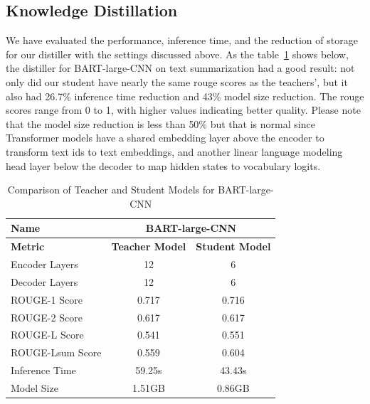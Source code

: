\documentclass{article}
\begin{document}
    \subsection{Knowledge Distillation}
    \hspace*{1em} We have evaluated the performance, inference time, and the reduction of storage for our distiller with the settings discussed above. As the table~\ref{tab:BART_comparison} shows below, the distiller for BART-large-CNN on text summarization had a good result: not only did our student have nearly the same rouge scores as the teachers', but it also had 26.7\% inference time reduction and 43\% model size reduction. The rouge scores range from 0 to 1, with higher values indicating better quality. Please note that the model size reduction is less than 50\% but that is normal since Transformer models have a shared embedding layer above the encoder to transform text ids to text embeddings,  %
    and another linear language modeling head layer below the decoder to map hidden states to vocabulary logits. %

    \begin{table}[h!]
        \centering
        \begin{tabular}{lcc}
            \toprule
            \textbf{Name}         & \multicolumn{2}{c}{\textbf{BART-large-CNN}} \\ \midrule
            \textbf{Metric}       & \textbf{Teacher Model} & \textbf{Student Model} \\ \midrule
            Encoder Layers        & 12                     & 6                     \\
            Decoder Layers        & 12                     & 6                     \\
            ROUGE-1 Score         & 0.717                  & 0.716                  \\
            ROUGE-2 Score         & 0.617                  & 0.617                  \\
            ROUGE-L Score         & 0.541                  & 0.551                  \\
            ROUGE-Lsum Score      & 0.559                  & 0.604                  \\
            Inference Time        & 59.25s                 & 43.43s                 \\
            Model Size            & 1.51GB                 & 0.86GB                 \\ \bottomrule
        \end{tabular}
        \caption{Comparison of Teacher and Student Models for BART-large-CNN}
        \label{tab:BART_comparison}
    \end{table}
\end{document}
